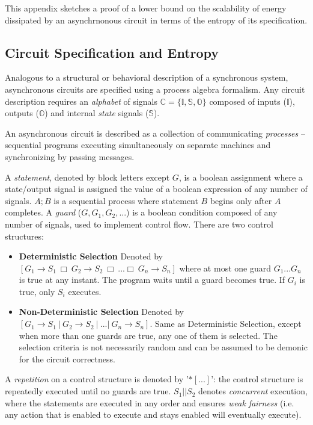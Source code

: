 This appendix sketches a proof of a lower bound on the scalability of
energy dissipated by an asynchrnonous circuit in terms of the entropy of its specification.

\subsection{Circuit Specification and Entropy}

Analogous to a structural or behavioral description of a synchronous system,
asynchronous circuits are specified using a process algebra formalism.
Any circuit description requires an \emph{alphabet} of signals 
$\mathbb{C} = \{\mathbb{I}, \mathbb{S}, \mathbb{O}\}$ composed of  
inputs ($\mathbb{I}$), outputs ($\mathbb{O}$) and internal \emph{state}
signals ($\mathbb{S}$). 

An asynchronous circuit is described as a collection of communicating \emph{processes} --
sequential programs executing simultaneously on separate machines and 
synchronizing by passing messages. 

A \emph{statement}, denoted by block letters except $G$, is a boolean assignment
where a state/output signal is assigned the value of a boolean expression 
of any number of signals. $A; B$ is a sequential process 
where statement $B$ begins only after $A$ completes. 
A \emph{guard} ($G, G_1, G_2, ...$) is a boolean condition composed of any number of
signals, used to implement control flow. There are two control structures:
\begin{itemize}
	\item \textbf{Deterministic Selection} Denoted by 
		$[ G_1 \to S_1\ \Box\ G_2 \to S_2\ \Box\ ... \Box\ G_n \to S_n ]$  
		where at most one guard $G_1 ... G_n$ is true at any instant. 
		The program waits until a guard becomes true. 
		If $G_i$ is true, only $S_i$ executes.

	\item \textbf{Non-Deterministic Selection} Denoted by 
		$[ G_1 \to S_1\ |\ G_2 \to S_2\ |\ ... |\ G_n \to S_n ]$.
		Same as Deterministic Selection, except when more than one
		guards are true, any one of them is selected. The selection criteria
		is not necessarily random and can be assumed to be demonic for the
		circuit correctness.
\end{itemize}
A \emph{repetition} on a control structure is denoted by '$*[...]$': 
the control structure is repeatedly executed until no guards are true.
$S_1 || S_2$ denotes \emph{concurrent} execution, where the statements are executed
in any order and ensures \emph{weak fairness} (i.e. any action that is enabled
to execute and stays enabled will eventually execute).

